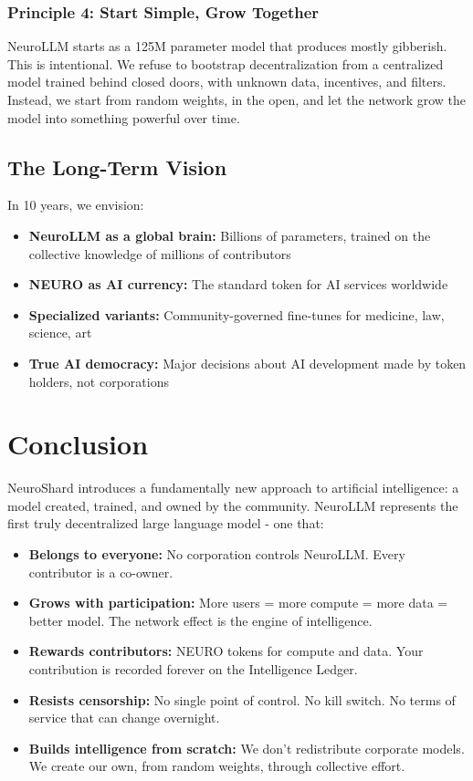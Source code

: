 \documentclass[11pt,a4paper]{article}
\begin{document}
\subsubsection{Principle 4: Start Simple, Grow Together}
NeuroLLM starts as a 125M parameter model that produces mostly gibberish. This is intentional. We refuse to bootstrap decentralization from a centralized model trained behind closed doors, with unknown data, incentives, and filters. Instead, we start from random weights, in the open, and let the network grow the model into something powerful over time.

\subsection{The Long-Term Vision}

In 10 years, we envision:
\begin{itemize}
    \item \textbf{NeuroLLM as a global brain:} Billions of parameters, trained on the collective knowledge of millions of contributors
    \item \textbf{NEURO as AI currency:} The standard token for AI services worldwide
    \item \textbf{Specialized variants:} Community-governed fine-tunes for medicine, law, science, art
    \item \textbf{True AI democracy:} Major decisions about AI development made by token holders, not corporations
\end{itemize}

\section{Conclusion}

NeuroShard introduces a fundamentally new approach to artificial intelligence: a model created, trained, and owned by the community. NeuroLLM represents the first truly decentralized large language model - one that:

\begin{itemize}
    \item \textbf{Belongs to everyone:} No corporation controls NeuroLLM. Every contributor is a co-owner.
    \item \textbf{Grows with participation:} More users = more compute = more data = better model. The network effect is the engine of intelligence.
    \item \textbf{Rewards contributors:} NEURO tokens for compute and data. Your contribution is recorded forever on the Intelligence Ledger.
    \item \textbf{Resists censorship:} No single point of control. No kill switch. No terms of service that can change overnight.
    \item \textbf{Builds intelligence from scratch:} We don't redistribute corporate models. We create our own, from random weights, through collective effort.
\end{itemize}
\end{document}
